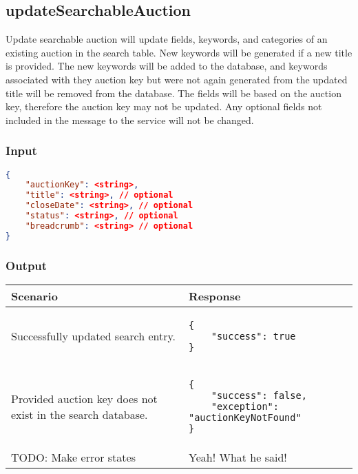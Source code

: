 \documentclass[12pt,a4paper]{article}
\begin{document}
\subsection{updateSearchableAuction}
Update searchable auction will update fields, keywords, and categories of an
existing auction in the search table. New keywords will be generated if a new
title is provided. The new keywords will be added to the database, and keywords
associated with they auction key but were not again generated from the updated
title will be removed from the database. The fields will be based on the
auction key, therefore the auction key may not be updated. Any optional fields
not included in the message to the service will not be changed.

\subsubsection{Input}
\begin{lstlisting}[language=json,firstnumber=1]
{
    "auctionKey": <string>,
    "title": <string>, // optional
    "closeDate": <string>, // optional
    "status": <string>, // optional
    "breadcrumb": <string> // optional
}
\end{lstlisting}

\subsubsection{Output}
\begin{center}
    \begin{tabular}{| p{5cm} | l |}
        \hline
        \textbf{Scenario} & \textbf{Response} \\
        \hline
        Successfully updated search entry. &
        \begin{lstlisting}[boxpos=t,language=tableJson,firstnumber=1]
{
    "success": true
}
        \end{lstlisting} \\ 
        \hline
        Provided auction key does not exist in the search database. & 
        \begin{lstlisting}[boxpos=t,language=tableJson,firstnumber=1]
{
    "success": false,
    "exception": "auctionKeyNotFound"
}
        \end{lstlisting} \\
        \hline
            TODO: Make error states & Yeah! What he said! \\
        \hline
    \end{tabular}
\end{center}
\end{document}
